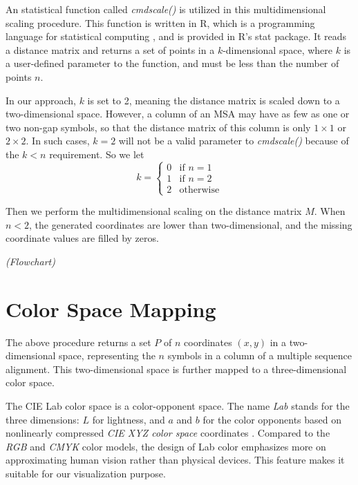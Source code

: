 An statistical function called \emph{cmdscale()} \cite{R2009aa} is utilized in this multidimensional scaling procedure. This function is written in R, which is a programming language for statistical computing \cite{Gentleman:aa}, and is provided in R’s stat package. It reads a distance matrix and returns a set of points in a $k$-dimensional space, where $k$ is a user-defined parameter to the function, and must be less than the number of points $n$. \cite{Cailliez:1983aa,Cox:2008aa}

In our approach, $k$ is set to 2, meaning the distance matrix is scaled down to a two-dimensional space. However, a column of an MSA may have as few as one or two non-gap symbols, so that the distance matrix of this column is only $1 \times 1$ or $2 \times 2$. In such cases, $k=2$ will not be a valid parameter to \emph{cmdscale()} because of the $k<n$ requirement. So we let
\[
k = \left\{ \begin{array}{ll}
0 & \mbox{if $n=1$} \\
1 & \mbox{if $n=2$} \\
2 & \mbox{otherwise}
\end{array}
\right.
\]

Then we perform the multidimensional scaling on the distance matrix $M$. When $n<2$, the generated coordinates are lower than two-dimensional, and the missing coordinate values are filled by zeros.

\emph{(Flowchart)}

\section{Color Space Mapping}

The above procedure returns a set $P$ of $n$ coordinates $(x,y)$ in a two-dimensional space, representing the $n$ symbols in a column of a multiple sequence alignment. This two-dimensional space is further mapped to a three-dimensional color space.

The CIE Lab color space \cite {McLAREN:1976aa} is a color-opponent space. The name \emph{Lab} stands for the three dimensions: $L$ for lightness, and $a$ and $b$ for the color opponents based on nonlinearly compressed \emph{CIE XYZ color space} coordinates \cite{CIE:1932aa,Smith:1931aa}. Compared to the \emph{RGB} and \emph{CMYK} color models, the design of Lab color emphasizes more on approximating human vision rather than physical devices. This feature makes it suitable for our visualization purpose. \cite{Margulis:2005aa}

